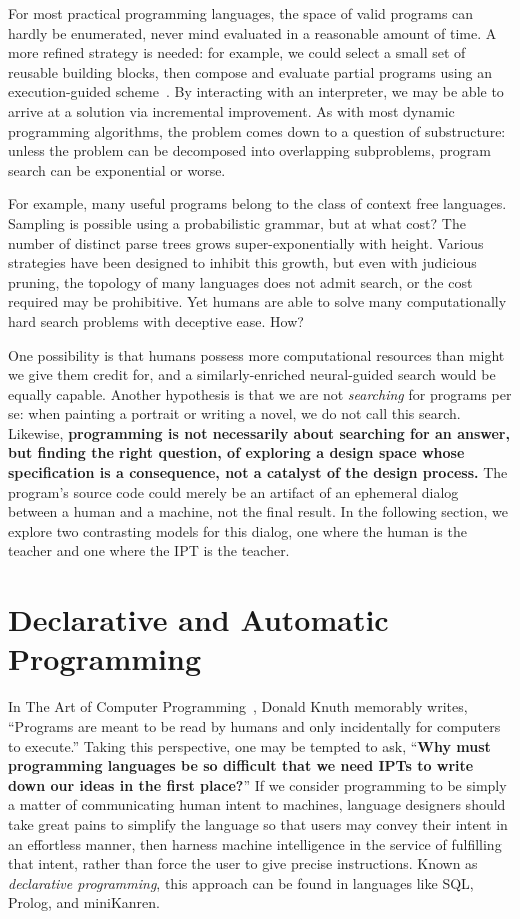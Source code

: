 \documentclass[12pt]{article}
\begin{document}
For most practical programming languages, the space of valid programs can hardly be enumerated, never mind evaluated in a reasonable amount of time. A more refined strategy is needed: for example, we could select a small set of reusable building blocks, then compose and evaluate partial programs using an execution-guided scheme~\cite{chen2018execution, wang2018execution}. By interacting with an interpreter, we may be able to arrive at a solution via incremental improvement. As with most dynamic programming algorithms, the problem comes down to a question of substructure: unless the problem can be decomposed into overlapping subproblems, program search can be exponential or worse.

For example, many useful programs belong to the class of context free languages. Sampling is possible using a probabilistic grammar, but at what cost? The number of distinct parse trees grows super-exponentially with height. Various strategies have been designed to inhibit this growth, but even with judicious pruning, the topology of many languages does not admit search, or the cost required may be prohibitive. Yet humans are able to solve many computationally hard search problems with deceptive ease. How?

One possibility is that humans possess more computational resources than might we give them credit for, and a similarly-enriched neural-guided search would be equally capable. Another hypothesis is that we are not \textit{searching} for programs per se: when painting a portrait or writing a novel, we do not call this search. Likewise, \textbf{programming is not necessarily about searching for an answer, but finding the right question, of exploring a design space whose specification is a consequence, not a catalyst of the design process.} The program's source code could merely be an artifact of an ephemeral dialog between a human and a machine, not the final result. In the following section, we explore two contrasting models for this dialog, one where the human is the teacher and one where the IPT is the teacher.

\section{Declarative and Automatic Programming}\label{sec:automatic-and-declarative-programming}

In The Art of Computer Programming~\cite{knuth1997art}, Donald Knuth memorably writes, ``Programs are meant to be read by humans and only incidentally for computers to execute.'' Taking this perspective, one may be tempted to ask, ``\textbf{Why must programming languages be so difficult that we need IPTs to write down our ideas in the first place?}'' If we consider programming to be simply a matter of communicating human intent to machines, language designers should take great pains to simplify the language so that users may convey their intent in an effortless manner, then harness machine intelligence in the service of fulfilling that intent, rather than force the user to give precise instructions. Known as \textit{declarative programming}, this approach can be found in languages like SQL, Prolog, and miniKanren.
\end{document}

